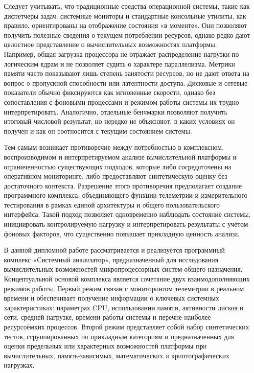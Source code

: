Следует учитывать, что традиционные средства операционной системы, такие как диспетчеры задач, системные мониторы и стандартные консольные утилиты, как правило, ориентированы на отображение состояния «в моменте». Они позволяют получить полезные сведения о текущем потреблении ресурсов, однако редко дают целостное представление о вычислительных возможностях платформы. Например, общая загрузка процессора не отражает распределение нагрузки по логическим ядрам и не позволяет судить о характере параллелизма. Метрики памяти часто показывают лишь степень занятости ресурсов, но не дают ответа на вопрос о пропускной способности или латентности доступа. Дисковые и сетевые показатели обычно фиксируются как мгновенные скорости, однако без сопоставления с фоновыми процессами и режимом работы системы их трудно интерпретировать. Аналогично, отдельные бенчмарки позволяют получить итоговый числовой результат, но нередко не объясняют, в каких условиях он получен и как он соотносится с текущим состоянием системы.

Тем самым возникает противоречие между потребностью в комплексном, воспроизводимом и интерпретируемом анализе вычислительной платформы и ограниченностью существующих подходов, которые либо сосредоточены на оперативном мониторинге, либо предоставляют синтетическую оценку без достаточного контекста. Разрешение этого противоречия предполагает создание программного комплекса, объединяющего функции телеметрии и измерительного тестирования в рамках единой архитектуры и общего пользовательского интерфейса. Такой подход позволяет одновременно наблюдать состояние системы, инициировать контролируемую нагрузку и интерпретировать результаты с учётом фоновых факторов, что существенно повышает прикладную ценность анализа.

В данной дипломной работе рассматривается и реализуется программный комплекс «Системный анализатор», предназначенный для исследования вычислительных возможностей микропроцессорных систем общего назначения. Концептуальной основой комплекса является сочетание двух взаимодополняющих режимов работы. Первый режим связан с мониторингом телеметрии в реальном времени и обеспечивает получение информации о ключевых системных характеристиках: параметрах CPU, использовании памяти, активности дисков и сети, средней нагрузке, времени работы системы и перечне наиболее ресурсоёмких процессов. Второй режим представляет собой набор синтетических тестов, сгруппированных по прикладным категориям и предназначенных для оценки предельных или характерных возможностей платформы при вычислительных, память-зависимых, математических и криптографических нагрузках.

